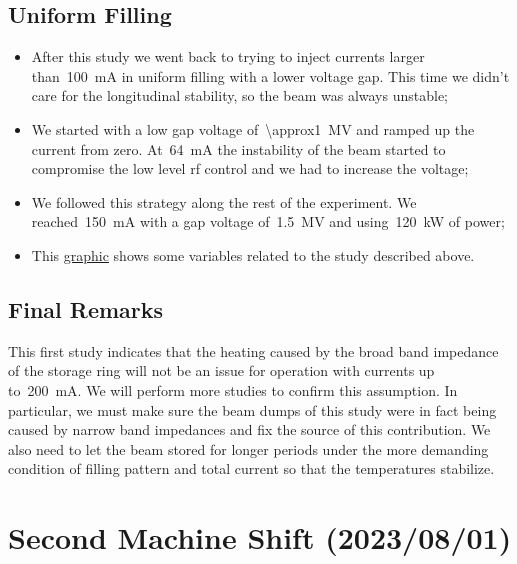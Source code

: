 \documentclass[a4paper,
               biblatex,     %
               ]{jacow}
\begin{document}
\subsection{Uniform Filling}
\begin{itemize}
    \item After this study we went back to trying to inject currents larger than~\SI{100}{\milli\ampere} in uniform filling with a lower voltage gap. This time we didn't care for the longitudinal stability, so the beam was always unstable;
    \item We started with a low gap voltage of~\SI{\approx1}{\mega\volt} and ramped up the current from zero. At~\SI{64}{\milli\ampere} the instability of the beam started to compromise the low level rf control and we had to increase the voltage;
    \item We followed this strategy along the rest of the experiment. We reached~\SI{150}{\milli\ampere} with a gap voltage of~\SI{1.5}{\mega\volt} and using~\SI{120}{\kilo\watt} of power;
    \item This \href{http://ais-eng-srv-ta.cnpem.br/archiver-viewer/index.html?pv=optimized_800(SI-Glob%3AAP-CurrInfo%3ACurrent-Mon)&pv=optimized_800(RA-TL%3ARF-Circulator-SIA%3APwrFwdOut-Mon)&pv=optimized_800(SI-02SB%3ARF-P7Cav%3AAmpVCav-Mon)&pv=optimized_800(SI-Glob%3ADI-BbBProc-L%3ASRAM_PEAK1)&from=2023-07-25T21%3A12%3A22.539Z&to=2023-07-25T22%3A12%3A22.539Z&ref=2023-07-25T00%3A03%3A59.368Z}{graphic} shows some variables related to the study described above.
\end{itemize}

\subsection{Final Remarks}

This first study indicates that the heating caused by the broad band impedance of the storage ring will not be an issue for operation with currents up to~\SI{200}{\milli\ampere}. We will perform more studies to confirm this assumption. In particular, we must make sure the beam dumps of this study were in fact being caused by narrow band impedances and fix the source of this contribution. We also need to let the beam stored for longer periods under the more demanding condition of filling pattern and total current so that the temperatures stabilize.

\section{Second Machine Shift (2023/08/01)}
\end{document}
